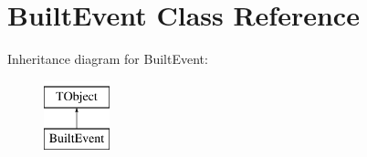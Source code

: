 \hypertarget{class_built_event}{}\section{Built\+Event Class Reference}
\label{class_built_event}
Inheritance diagram for Built\+Event\+:\begin{figure}[H]
\begin{center}
\leavevmode
\includegraphics[height=2.000000cm]{class_built_event}
\end{center}
\end{figure}
